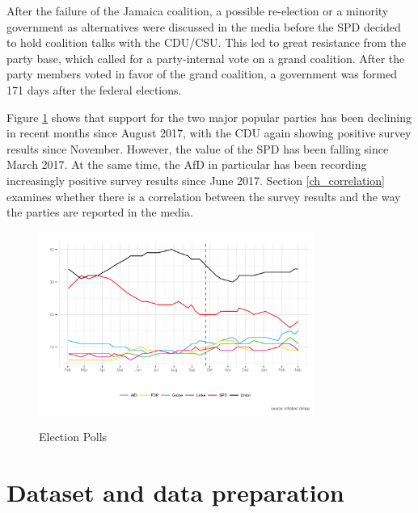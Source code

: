 \documentclass[12pt,a4paper,notitlepage]{article}
\begin{document}
After the failure of the Jamaica coalition, a possible re-election or a minority government as alternatives were discussed in the media before the SPD decided to hold coalition talks with the CDU/CSU. This led to great resistance from the party base, which called for a party-internal vote on a grand coalition. After the party members voted in favor of the grand coalition, a government was formed 171 days after the federal elections. 

Figure \ref{fig_polls} shows that support for the two major popular parties has been declining in recent months since August 2017, with the CDU again showing positive survey results since November. However, the value of the SPD has been falling since March 2017. At the same time, the AfD in particular has been recording increasingly positive survey results since June 2017. Section \ref{ch_correlation} examines whether there is a correlation between the survey results and the way the parties are reported in the media. 

\begin{figure}[H]
\begin{center}
	\caption{Election Polls}
	\includegraphics[width=0.8\textwidth]{../figs/polls.png}
	\label{fig_polls}
	\end{center}
\end{figure}

\section{Dataset and data preparation}\label{ch_data}
\end{document}
